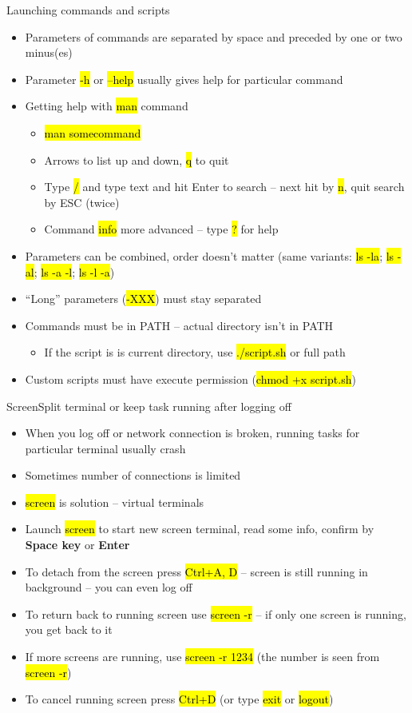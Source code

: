 \documentclass[compress, ucs, xelatex, 11pt, xcolor=svgnames,
  hyperref={
    bookmarks=true,
    unicode=true,
    colorlinks=true,
    pdftitle={Linux, command line and MetaCentrum},
    plainpages=false,
    pdfauthor={Vojtech Zeisek},
    pdfsubject={Course about use of Linux command line, writing shell scripts and using MetaCentrum of CESNET},
    pdfcreator={XeLaTeX},
    pdfkeywords={Linux, GNU, BASH, shell, command line, MetaCentrum},
    linkcolor=Red,
    anchorcolor=Blue,
    citecolor=Purple,
    filecolor=DodgerBlue,
    menucolor=DarkOrchid,
    urlcolor=DeepSkyBlue,
    pdftex},
  url={hyphens, lowtilde} %
  ]{beamer}
\renewcommand{\texttt}[1]{\hl{\ttfamily #1}}
\begin{document}
\begin{frame}{Launching commands and scripts}
\begin{itemize}
  \item Parameters of commands are separated by space and preceded by one or two minus(es)
  \item Parameter \texttt{-h} or \texttt{--help} usually gives help for particular command
  \item Getting help with \texttt{man} command
  \begin{itemize}
    \item \texttt{man somecommand}
    \item Arrows to list up and down, \texttt{q} to quit
    \item Type \texttt{/} and type text and hit Enter to search -- next hit by \texttt{n}, quit search by ESC (twice)
    \item Command \texttt{info} more advanced -- type \texttt{?} for help
  \end{itemize}
  \item Parameters can be combined, order doesn't matter (same variants: \texttt{ls -la}; \texttt{ls -al}; \texttt{ls -a -l}; \texttt{ls -l -a})
  \item ``Long'' parameters (\texttt{{-}-XXX}) must stay separated
  \item Commands must be in PATH -- actual directory isn't in PATH
  \begin{itemize}
    \item If the script is is current directory, use \texttt{./script.sh} or full path
  \end{itemize}
  \item Custom scripts must have execute permission (\texttt{chmod +x script.sh})
\end{itemize}
\end{frame}

\begin{frame}{Screen}{Split terminal or keep task running after logging off}
\begin{itemize}
  \item When you log off or network connection is broken, running tasks for particular terminal usually crash
  \item Sometimes number of connections is limited
  \item \texttt{screen} is solution -- virtual terminals
  \item Launch \texttt{screen} to start new screen terminal, read some info, confirm by \textbf{Space key} or \textbf{Enter}
  \item To detach from the screen press \texttt{Ctrl+A, D} -- screen is still running in background -- you can even log off
  \item To return back to running screen use \texttt{screen -r} -- if only one screen is running, you get back to it
  \item If more screens are running, use \texttt{screen -r 1234} (the number is seen from \texttt{screen -r})
  \item To cancel running screen press \texttt{Ctrl+D} (or type \texttt{exit} or \texttt{logout})
\end{itemize}
\end{frame}
\end{document}
